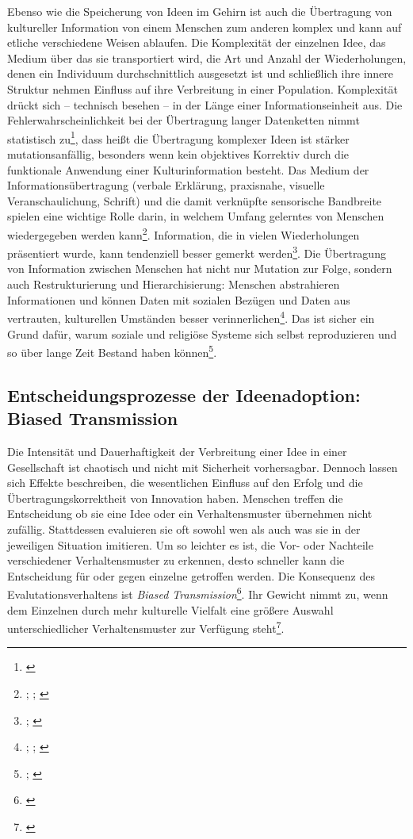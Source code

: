 \documentclass[openany,twoside,twocolumn]{book}
\let\rmarkdownfootnote\footnote%
\def\footnote{\protect\rmarkdownfootnote}
\begin{document}
Ebenso wie die Speicherung von Ideen im Gehirn ist auch die Übertragung
von kultureller Information von einem Menschen zum anderen komplex und
kann auf etliche verschiedene Weisen ablaufen. Die Komplexität der
einzelnen Idee, das Medium über das sie transportiert wird, die Art und
Anzahl der Wiederholungen, denen ein Individuum durchschnittlich
ausgesetzt ist und schließlich ihre innere Struktur nehmen Einfluss auf
ihre Verbreitung in einer Population. Komplexität drückt sich --
technisch besehen -- in der Länge einer Informationseinheit aus. Die
Fehlerwahrscheinlichkeit bei der Übertragung langer Datenketten nimmt
statistisch zu\footnote{\textcite{eerkens_cultural_2007}}, dass heißt
die Übertragung komplexer Ideen ist stärker mutationsanfällig, besonders
wenn kein objektives Korrektiv durch die funktionale Anwendung einer
Kulturinformation besteht. Das Medium der Informationsübertragung
(verbale Erklärung, praxisnahe, visuelle Veranschaulichung, Schrift) und
die damit verknüpfte sensorische Bandbreite spielen eine wichtige Rolle
darin, in welchem Umfang gelerntes von Menschen wiedergegeben werden
kann\footnote{\textcite{eerkens_cultural_2005};
  \textcite{eerkens_practice_2000}; \textcite{eerkens_techniques_2001}}.
Information, die in vielen Wiederholungen präsentiert wurde, kann
tendenziell besser gemerkt werden\footnote{\textcite{cover_elements_2012};
  \textcite{shannon_mathematical_1949}}. Die Übertragung von Information
zwischen Menschen hat nicht nur Mutation zur Folge, sondern auch
Restrukturierung und Hierarchisierung: Menschen abstrahieren
Informationen und können Daten mit sozialen Bezügen und Daten aus
vertrauten, kulturellen Umständen besser verinnerlichen\footnote{\textcite{mesoudi_hierarchical_2004};
  \textcite{mesoudi_bias_2006}; \textcite{washburn_remembering_2001}}.
Das ist sicher ein Grund dafür, warum soziale und religiöse Systeme sich
selbst reproduzieren und so über lange Zeit Bestand haben
können\footnote{\textcite{kuijt_people_2000};
  \textcite{kuijt_place_2001}}.

\hypertarget{Biased-transmission}{%
\subsection{Entscheidungsprozesse der Ideenadoption: Biased
Transmission}\label{Biased-transmission}}

Die Intensität und Dauerhaftigkeit der Verbreitung einer Idee in einer
Gesellschaft ist chaotisch und nicht mit Sicherheit vorhersagbar.
Dennoch lassen sich Effekte beschreiben, die wesentlichen Einfluss auf
den Erfolg und die Übertragungskorrektheit von Innovation haben.
Menschen treffen die Entscheidung ob sie eine Idee oder ein
Verhaltensmuster übernehmen nicht zufällig. Stattdessen evaluieren sie
oft sowohl wen als auch was sie in der jeweiligen Situation imitieren.
Um so leichter es ist, die Vor- oder Nachteile verschiedener
Verhaltensmuster zu erkennen, desto schneller kann die Entscheidung für
oder gegen einzelne getroffen werden. Die Konsequenz des
Evalutationsverhaltens ist \emph{Biased Transmission}\footnote{\textcite{henrich_cultural_2001}}.
Ihr Gewicht nimmt zu, wenn dem Einzelnen durch mehr kulturelle Vielfalt
eine größere Auswahl unterschiedlicher Verhaltensmuster zur Verfügung
steht\footnote{\textcite{smith_cultural_1992}}.
\end{document}
